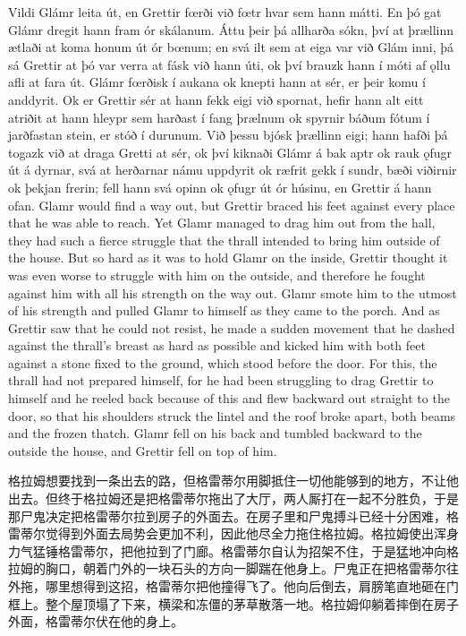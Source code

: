 \begin{paracol}{2}
  Vildi Glámr leita út, en Grettir fœrði við fœtr hvar sem hann mátti. En þó gat Glámr dregit hann fram ór skálanum. Áttu þeir þá allharða sókn, því at þrællinn ætlaði at koma honum út ór bœnum; en svá ilt sem at eiga var við Glám inni, þá sá Grettir at þó var verra at fásk við hann úti, ok því brauzk hann í móti af ǫllu afli at fara út. Glámr fœrðisk í aukana ok knepti hann at sér, er þeir komu í anddyrit. Ok er Grettir sér at hann fekk eigi við spornat, hefir hann alt eitt atriðit at hann hleypr sem harðast í fang þrælnum ok spyrnir báðum fótum í jarðfastan stein, er stóð í durunum. Við þessu bjósk þrællinn eigi; hann hafði þá togazk við at draga Gretti at sér, ok því kiknaði Glámr á bak aptr ok rauk ǫfugr út á dyrnar, svá at herðarnar námu uppdyrit ok ræfrit gekk í sundr, bæði viðirnir ok þekjan frerin; fell hann svá opinn ok ǫfugr út ór húsinu, en Grettir á hann ofan.
  \switchcolumn
  Glamr would find a way out, but Grettir braced his feet against every place that he was able to reach. Yet Glamr managed to drag him out from the hall, they had such a fierce struggle that the thrall intended to bring him outside of the house. But so hard as it was to hold Glamr on the inside, Grettir thought it was even worse to struggle with him on the outside, and therefore he fought against him with all his strength on the way out. Glamr smote him to the utmost of his strength and pulled Glamr to himself as they came to the porch. And as Grettir saw that he could not resist, he made a sudden movement that he dashed against the thrall's breast as hard as possible and kicked him with both feet against a stone fixed to the ground, which stood before the door. For this, the thrall had not prepared himself, for he had been struggling to drag Grettir to himself and he reeled back because of this and flew backward out straight to the door, so that his shoulders struck the lintel and the roof broke apart, both beams and the frozen thatch. Glamr fell on his back and tumbled backward to the outside the house, and Grettir fell on top of him.
\end{paracol}
\begin{translation*}{}
  格拉姆想要找到一条出去的路，但格雷蒂尔用脚抵住一切他能够到的地方，不让他出去。但终于格拉姆还是把格雷蒂尔拖出了大厅，两人厮打在一起不分胜负，于是那尸鬼决定把格雷蒂尔拉到房子的外面去。在房子里和尸鬼搏斗已经十分困难，格雷蒂尔觉得到外面去局势会更加不利，因此他尽全力拖住格拉姆。格拉姆使出浑身力气猛锤格雷蒂尔，把他拉到了门廊。格雷蒂尔自认为招架不住，于是猛地冲向格拉姆的胸口，朝着门外的一块石头的方向一脚踹在他身上。尸鬼正在把格雷蒂尔往外拖，哪里想得到这招，格雷蒂尔把他撞得飞了。他向后倒去，肩膀笔直地砸在门框上。整个屋顶塌了下来，横梁和冻僵的茅草散落一地。格拉姆仰躺着摔倒在房子外面，格雷蒂尔伏在他的身上。
\end{translation*}
